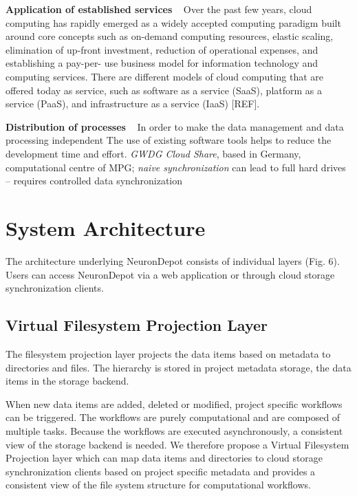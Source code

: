 \documentclass{frontiersSCNS} %
\begin{document}
\textbf{Application of established services} \texttt{  } Over the past few
years, cloud computing has rapidly emerged as a widely accepted computing
paradigm built around core concepts such as on-demand computing resources,
elastic scaling, elimination of up-front investment, reduction of operational
expenses, and establishing a pay-per- use business model for information
technology and computing services. There are different models of cloud
computing that are offered today as service, such as software as a service
(SaaS), platform as a service (PaaS), and infrastructure as a service (IaaS)
[REF].

\textbf{Distribution of processes} \texttt{  } In order to make the data
management and data processing independent The use of existing software tools
helps to reduce the development time and effort.  \emph{GWDG Cloud Share}, based in
Germany, computational centre of MPG; \emph{naive synchronization} can lead to full
hard drives – requires controlled data synchronization


\section{System Architecture}

The architecture underlying NeuronDepot consists of individual layers (Fig. 6). Users can access NeuronDepot via a web application or through cloud storage synchronization clients.


\subsection{Virtual Filesystem Projection Layer}
The filesystem projection layer projects the data items based on metadata to
directories and files. The hierarchy is stored in project metadata storage, the
data items in the storage backend.

When new data items are added, deleted or modified, project specific workflows
can be triggered.  The workflows are purely computational and are composed of
multiple tasks. Because the workflows are executed asynchronously, a consistent
view of the storage backend is needed. We therefore propose a Virtual
Filesystem Projection layer which can map data items and directories to cloud
storage synchronization clients based on project specific metadata and provides
a consistent view of the file system structure for computational workflows.
\end{document}
